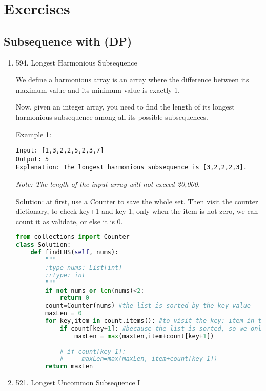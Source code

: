 \documentclass[../main.tex]{subfiles}
\begin{document}
\section{Exercises}
\subsection{Subsequence with (DP)}

\begin{enumerate}
    \item 594. Longest Harmonious Subsequence

We define a harmonious array is an array where the difference between its maximum value and its minimum value is exactly 1.

Now, given an integer array, you need to find the length of its longest harmonious subsequence among all its possible subsequences.

Example 1:
\begin{lstlisting}
Input: [1,3,2,2,5,2,3,7]
Output: 5
Explanation: The longest harmonious subsequence is [3,2,2,2,3].
\end{lstlisting}

\textit{Note: The length of the input array will not exceed 20,000.}

Solution: at first, use a Counter to save the whole set. Then visit the counter dictionary, to check key+1 and key-1, only when the item is not zero, we can count it as validate, or else it is 0.
\begin{lstlisting}[language = Python]
from collections import Counter
class Solution:
    def findLHS(self, nums):
        """
        :type nums: List[int]
        :rtype: int
        """
        if not nums or len(nums)<2:
            return 0
        count=Counter(nums) #the list is sorted by the key value
        maxLen = 0
        for key,item in count.items(): #to visit the key: item in the counter
            if count[key+1]: #because the list is sorted, so we only need to check key+1
                maxLen = max(maxLen,item+count[key+1])
            
            # if count[key-1]:
            #     maxLen=max(maxLen, item+count[key-1])
        return maxLen
\end{lstlisting}

\item 521. Longest Uncommon Subsequence I


\end{enumerate}
\end{document}

